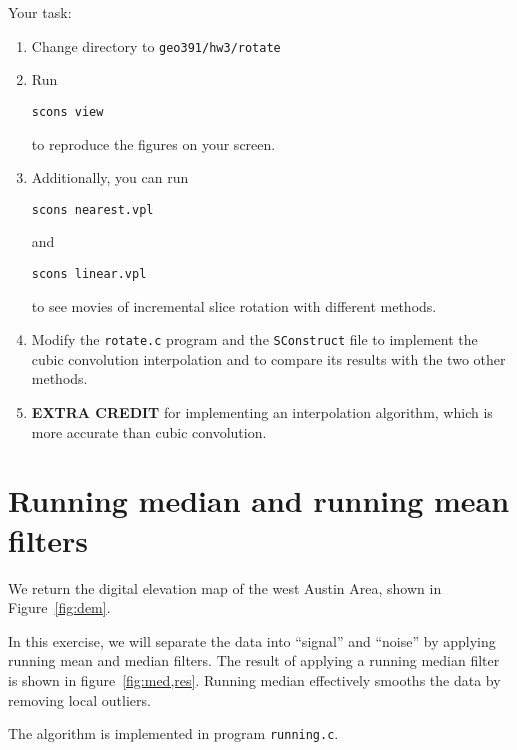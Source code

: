 Your task:
\begin{enumerate}
\item Change directory to \verb#geo391/hw3/rotate#
\item Run 
\begin{verbatim}
scons view
\end{verbatim}
to reproduce the figures on your screen.
\item Additionally, you can run
\begin{verbatim}
scons nearest.vpl
\end{verbatim}
and
\begin{verbatim}
scons linear.vpl
\end{verbatim}
to see movies of incremental slice rotation with different methods.
\item Modify the \texttt{rotate.c} program and the \texttt{SConstruct} file to implement the cubic convolution interpolation and to compare 
its results with the two other methods.
\item \textbf{EXTRA CREDIT} for implementing an interpolation algorithm, which is more accurate than cubic convolution.
\end{enumerate}

\section{Running median and running mean filters}


We return the digital elevation map of the west Austin Area, shown in Figure~\ref{fig:dem}.

In this exercise, we will separate the data into ``signal'' and
``noise'' by applying running mean and median filters.  The result of
applying a running median filter is shown in
figure~\ref{fig:med,res}. Running median effectively smooths the data
by removing local outliers.


The algorithm is implemented in program \texttt{running.c}.



